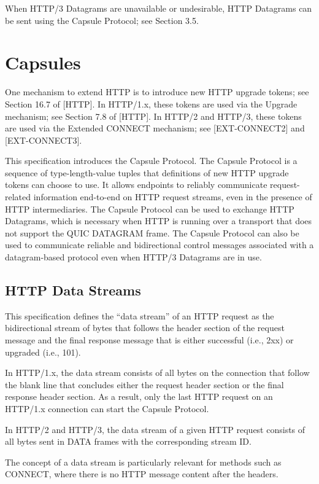 \documentclass{article}
\begin{document}
When HTTP/3 Datagrams are unavailable or undesirable, HTTP Datagrams
can be sent using the Capsule Protocol; see Section 3.5.

\section{Capsules}

One mechanism to extend HTTP is to introduce new HTTP upgrade tokens;
see Section 16.7 of [HTTP].  In HTTP/1.x, these tokens are used via
the Upgrade mechanism; see Section 7.8 of [HTTP].  In HTTP/2 and
HTTP/3, these tokens are used via the Extended CONNECT mechanism; see
[EXT-CONNECT2] and [EXT-CONNECT3].

This specification introduces the Capsule Protocol.  The Capsule
Protocol is a sequence of type-length-value tuples that definitions
of new HTTP upgrade tokens can choose to use.  It allows endpoints to
reliably communicate request-related information end-to-end on HTTP
request streams, even in the presence of HTTP intermediaries.  The
Capsule Protocol can be used to exchange HTTP Datagrams, which is
necessary when HTTP is running over a transport that does not support
the QUIC DATAGRAM frame.  The Capsule Protocol can also be used to
communicate reliable and bidirectional control messages associated
with a datagram-based protocol even when HTTP/3 Datagrams are in use.

\subsection{HTTP Data Streams}

This specification defines the ``data stream'' of an HTTP request as
the bidirectional stream of bytes that follows the header section of
the request message and the final response message that is either
successful (i.e., 2xx) or upgraded (i.e., 101).

In HTTP/1.x, the data stream consists of all bytes on the connection
that follow the blank line that concludes either the request header
section or the final response header section.  As a result, only the
last HTTP request on an HTTP/1.x connection can start the Capsule
Protocol.

In HTTP/2 and HTTP/3, the data stream of a given HTTP request
consists of all bytes sent in DATA frames with the corresponding
stream ID.

The concept of a data stream is particularly relevant for methods
such as CONNECT, where there is no HTTP message content after the
headers.
\end{document}
